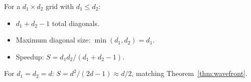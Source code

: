 \documentclass[10pt,onecolumn]{article}
\begin{document}
For a $d_1 \times d_2$ grid with $d_1 \leq d_2$:
\begin{itemize}
  \item $d_1 + d_2 - 1$ total diagonals.
  \item Maximum diagonal size: $\min(d_1, d_2) = d_1$.
  \item Speedup: $S = d_1 d_2 / (d_1 + d_2 - 1)$.
\end{itemize}
For $d_1 = d_2 = d$: $S = d^2/(2d-1) \approx d/2$, matching Theorem~\ref{thm:wavefront}.



\end{document}

